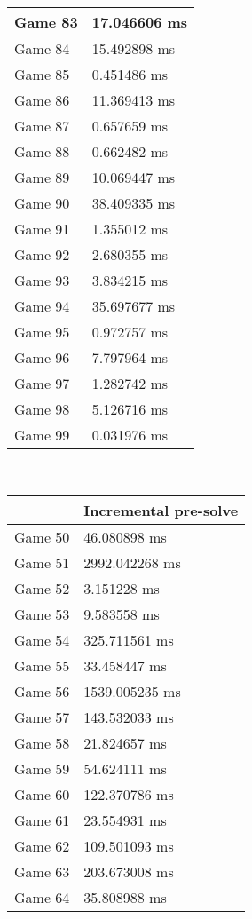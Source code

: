 \begin{multicols}{2}
\begin{tabular}{|l|l|}
	Game 83 & 17.046606 ms \\ \hline
	Game 84 & 15.492898 ms \\ \hline
	Game 85 & 0.451486 ms \\ \hline
	Game 86 & 11.369413 ms \\ \hline
	Game 87 & 0.657659 ms \\ \hline
	Game 88 & 0.662482 ms \\ \hline
	Game 89 & 10.069447 ms \\ \hline
	Game 90 & 38.409335 ms \\ \hline
	Game 91 & 1.355012 ms \\ \hline
	Game 92 & 2.680355 ms \\ \hline
	Game 93 & 3.834215 ms \\ \hline
	Game 94 & 35.697677 ms \\ \hline
	Game 95 & 0.972757 ms \\ \hline
	Game 96 & 7.797964 ms \\ \hline
	Game 97 & 1.282742 ms \\ \hline
	Game 98 & 5.126716 ms \\ \hline
	Game 99 & 0.031976 ms \\ \hline
\end{tabular}\\
\begin{tabular}{|l|l|}
	\hline
	& Incremental pre-solve \\ \hline
	Game 50 & 46.080898 ms \\ \hline
	Game 51 & 2992.042268 ms \\ \hline
	Game 52 & 3.151228 ms \\ \hline
	Game 53 & 9.583558 ms \\ \hline
	Game 54 & 325.711561 ms \\ \hline
	Game 55 & 33.458447 ms \\ \hline
	Game 56 & 1539.005235 ms \\ \hline
	Game 57 & 143.532033 ms \\ \hline
	Game 58 & 21.824657 ms \\ \hline
	Game 59 & 54.624111 ms \\ \hline
	Game 60 & 122.370786 ms \\ \hline
	Game 61 & 23.554931 ms \\ \hline
	Game 62 & 109.501093 ms \\ \hline
	Game 63 & 203.673008 ms \\ \hline
	Game 64 & 35.808988 ms \\ \hline

\end{tabular}
\end{multicols}
